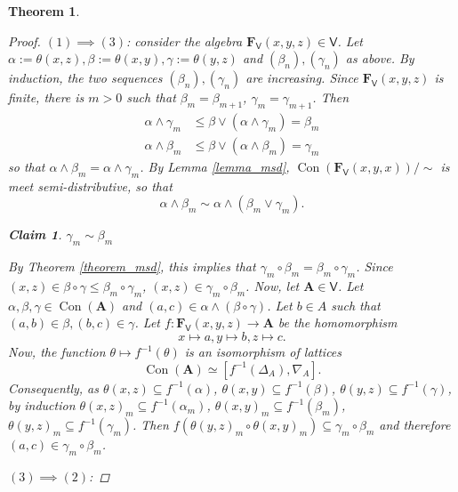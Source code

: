 \documentclass{amsart}
\theoremstyle{plain}
\newtheorem{theorem}{Theorem}[section]
\newtheorem{claim}{Claim}
\theoremstyle{definition}
\theoremstyle{remark}
\DeclareMathOperator{\Con}{Con}
\begin{document}
\begin{theorem}
\begin{proof}
        $(1) \implies (3)$: consider the algebra $\mathbf{F}_{\mathsf{V}}(x,y,z) \in \mathsf{V}$. 
        Let $\alpha:=\theta(x,z), \beta:=\theta(x,y), \gamma:=\theta(y,z)$ and $(\beta_n), (\gamma_n)$ as above. 
        By induction, the two sequences $(\beta_n), (\gamma_n)$ are increasing. 
        Since $\mathbf{F}_{\mathsf{V}}(x,y,z)$ is finite, there is $m > 0$ such that $\beta_m = \beta_{m+1}$, $\gamma_m = \gamma_{m+1}$. 
        Then 
        \begin{align*}
            \alpha \land \gamma_m & \le \beta \lor (\alpha \land \gamma_m) = \beta_m \\
            \alpha \land \beta_m & \le \beta \lor (\alpha \land \beta_m) = \gamma_m
        \end{align*}
        so that $\alpha \land \beta_m = \alpha \land \gamma_m$. 
        By Lemma \ref{lemma_msd}, $\Con(\mathbf{F}_{\mathsf{V}}(x,y,x))/ \sim$ is meet semi-distributive, so that 
        \begin{equation*}
            \alpha \land \beta_m \sim \alpha \land (\beta_m \lor \gamma_m) \text{.}
        \end{equation*}
        \begin{claim}
            $\gamma_m \sim \beta_m$ 
        \end{claim}
        By Theorem \ref{theorem_msd}, this implies that $\gamma_m \circ \beta_m = \beta_m \circ \gamma_m$. 
        Since $(x,z) \in \beta \circ \gamma \le \beta_m \circ \gamma_m$, $(x,z) \in \gamma_m \circ \beta_m$.
        Now, let $\mathbf{A} \in \mathsf{V}$. 
        Let $\alpha, \beta, \gamma \in \Con(\mathbf{A})$ and $(a,c) \in \alpha \land (\beta \circ \gamma)$. 
        Let $b \in A$ such that $(a,b) \in \beta, (b,c) \in \gamma$. 
        Let $f: \mathbf{F}_{\mathsf{V}}(x,y,z) \to \mathbf{A}$ be the homomorphism
        \begin{equation*}
            x \mapsto a, y \mapsto b, z \mapsto c \text{.}
        \end{equation*} 
        Now, the function $\theta \mapsto f^{-1}(\theta)$ is an isomorphism of lattices 
        \begin{equation*}
            \Con(\mathbf{A}) \simeq [f^{-1}(\Delta_A), \nabla_A] \text{.}
        \end{equation*}
        Consequently, as $\theta(x,z) \subseteq f^{-1}(\alpha)$, $\theta(x,y) \subseteq f^{-1}(\beta)$, $\theta(y,z) \subseteq f^{-1}(\gamma)$, by induction  
        $\theta(x,z)_m \subseteq f^{-1}(\alpha_m)$, $\theta(x,y)_m \subseteq f^{-1}(\beta_m)$, $\theta(y,z)_m \subseteq f^{-1}(\gamma_m)$.
        Then $f(\theta(y,z)_m \circ \theta(x,y)_m) \subseteq \gamma_m \circ \beta_m$ and therefore $(a,c) \in \gamma_m \circ \beta_m$. 

        $(3) \implies (2)$:
    \end{proof}
\end{theorem}
\end{document}

